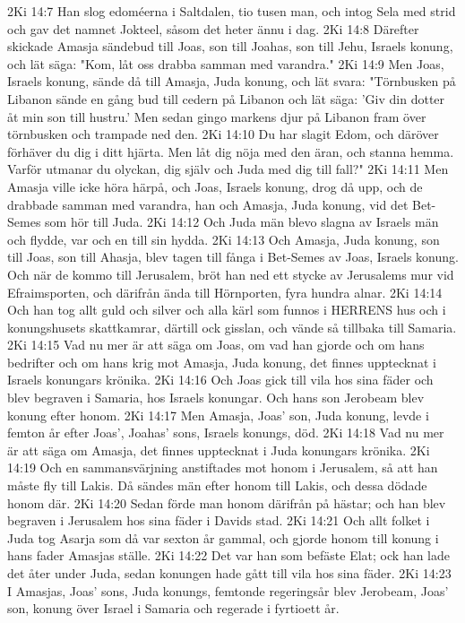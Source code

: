 2Ki 14:7  Han slog edoméerna i Saltdalen, tio tusen man, och intog Sela med strid och gav det namnet Jokteel, såsom det heter ännu i dag.
2Ki 14:8  Därefter skickade Amasja sändebud till Joas, son till Joahas, son till Jehu, Israels konung, och lät säga: "Kom, låt oss drabba samman med varandra."
2Ki 14:9  Men Joas, Israels konung, sände då till Amasja, Juda konung, och lät svara: "Törnbusken på Libanon sände en gång bud till cedern på Libanon och lät säga: 'Giv din dotter åt min son till hustru.' Men sedan gingo markens djur på Libanon fram över törnbusken och trampade ned den.
2Ki 14:10  Du har slagit Edom, och däröver förhäver du dig i ditt hjärta. Men låt dig nöja med den äran, och stanna hemma. Varför utmanar du olyckan, dig själv och Juda med dig till fall?"
2Ki 14:11  Men Amasja ville icke höra härpå, och Joas, Israels konung, drog då upp, och de drabbade samman med varandra, han och Amasja, Juda konung, vid det Bet-Semes som hör till Juda.
2Ki 14:12  Och Juda män blevo slagna av Israels män och flydde, var och en till sin hydda.
2Ki 14:13  Och Amasja, Juda konung, son till Joas, son till Ahasja, blev tagen till fånga i Bet-Semes av Joas, Israels konung. Och när de kommo till Jerusalem, bröt han ned ett stycke av Jerusalems mur vid Efraimsporten, och därifrån ända till Hörnporten, fyra hundra alnar.
2Ki 14:14  Och han tog allt guld och silver och alla kärl som funnos i HERRENS hus och i konungshusets skattkamrar, därtill ock gisslan, och vände så tillbaka till Samaria.
2Ki 14:15  Vad nu mer är att säga om Joas, om vad han gjorde och om hans bedrifter och om hans krig mot Amasja, Juda konung, det finnes upptecknat i Israels konungars krönika.
2Ki 14:16  Och Joas gick till vila hos sina fäder och blev begraven i Samaria, hos Israels konungar. Och hans son Jerobeam blev konung efter honom.
2Ki 14:17  Men Amasja, Joas' son, Juda konung, levde i femton år efter Joas', Joahas' sons, Israels konungs, död.
2Ki 14:18  Vad nu mer är att säga om Amasja, det finnes upptecknat i Juda konungars krönika.
2Ki 14:19  Och en sammansvärjning anstiftades mot honom i Jerusalem, så att han måste fly till Lakis. Då sändes män efter honom till Lakis, och dessa dödade honom där.
2Ki 14:20  Sedan förde man honom därifrån på hästar; och han blev begraven i Jerusalem hos sina fäder i Davids stad.
2Ki 14:21  Och allt folket i Juda tog Asarja som då var sexton år gammal, och gjorde honom till konung i hans fader Amasjas ställe.
2Ki 14:22  Det var han som befäste Elat; ock han lade det åter under Juda, sedan konungen hade gått till vila hos sina fäder.
2Ki 14:23  I Amasjas, Joas' sons, Juda konungs, femtonde regeringsår blev Jerobeam, Joas' son, konung över Israel i Samaria och regerade i fyrtioett år.
